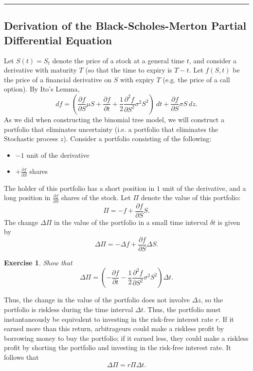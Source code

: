 \documentclass[letterpaper,10pt]{article}
\newtheorem{ex}{Exercise}
\begin{document}
\bigskip

\hrule

\bigskip

\subsection{Derivation of the Black-Scholes-Merton Partial Differential Equation}

\noindent Let $S(t)=S_t$ denote the price of a stock at a general time $t$, and consider a derivative with maturity $T$ (so that the time to expiry is $T-t$.  Let $f(S,t)$ be the price of a financial derivative on $S$ with expiry $T$ (e.g. the price of a call option).  By Ito's Lemma, $$df=\left(\frac{\partial f}{\partial S}\mu S+\frac{\partial f}{\partial t}+\frac{1}{2}\frac{\partial^2f}{\partial S^2}\sigma^2 S^2\right)\:dt+\frac{\partial f}{\partial S}\sigma S\:dz.$$  As we did when constructing the binomial tree model, we will construct a portfolio that eliminates uncertainty (i.e. a portfolio that eliminates the Stochastic process $z$).  Consider a portfolio consisting of the following:

\begin{itemize}

\item $-1$ unit of the derivative

\item $\displaystyle+\frac{\partial f}{\partial S}$ shares

\end{itemize}

\noindent The holder of this portfolio has a short position in $1$ unit of the derivative, and a long position in $\frac{\partial f}{\partial S}$ shares of the stock.  Let $\Pi$ denote the value of this portfolio:  $$\Pi=-f+\frac{\partial f}{\partial S}S.$$  The change $\Delta \Pi$ in the value of the portfolio in a small time interval $\delta t$ is given by $$\Delta \Pi=-\Delta f+\frac{\partial f}{\partial S}\Delta S.$$


\begin{ex}
Show that $$\Delta \Pi=\left(-\frac{\partial f}{\partial t}-\frac{1}{2}\frac{\partial^2f}{\partial S^2}\sigma^2 S^2\right)\Delta t.$$
\end{ex}

\noindent Thus, the change in the value of the portfolio does not involve $\Delta z$, so the portfolio is riskless during the time interval $\Delta t$.  Thus, the portfolio must instantaneously be equivalent to investing in the risk-free interest rate $r$.  If it earned more than this return, arbitrageurs could make a riskless profit by borrowing money to buy the portfolio; if it earned less, they could make a riskless profit by shorting the portfolio and investing in the risk-free interest rate. It follows that
$$\Delta \Pi=r\Pi\Delta t.$$
\end{document}
